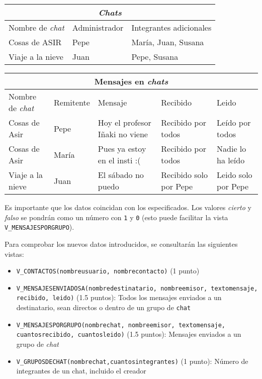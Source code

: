 \begin{homeworkProblem}
\begin{center}
  \begin{tabular}{|l|l|l|}
    \hline
    \multicolumn{3}{|c|}{\textit{Chats}} \\
    \hline
    Nombre de \textit{chat} & Administrador & Integrantes adicionales \\
    \hline
    Cosas de ASIR & Pepe & María, Juan, Susana \\
    Viaje a la nieve & Juan & Pepe, Susana \\
    \hline
  \end{tabular}

  
  \begin{tabular}{|l|l|l|l|l|}
    \hline
    \multicolumn{5}{|c|}{Mensajes en \textit{chats}} \\
    \hline
    Nombre de \textit{chat} & Remitente & Mensaje & Recibido & Leido \\
    \hline
    Cosas de Asir & Pepe & Hoy el profesor Iñaki no viene & Recibido por todos & Leído por todos \\
    Cosas de Asir & María & Pues ya estoy en el insti :( & Recibido por todos & Nadie lo ha leído \\
    Viaje a la nieve & Juan & El sábado no puedo & Recibido solo por Pepe & Leido solo por Pepe \\
    \hline
  \end{tabular}
\end{center}
  Es importante que los datos coincidan con los especificados. Los valores \textit{cierto} y \textit{falso} se pondrán como un número con \texttt{1} y \texttt{0} (esto puede facilitar la vista \texttt{V\_MENSAJESPORGRUPO}).
  

  Para comprobar los nuevos datos introducidos, se consultarán las siguientes vistas:
  
  \begin{itemize}
  \item \texttt{V\_CONTACTOS(nombreusuario, nombrecontacto)} (1 punto)
  
  \item \texttt{V\_MENSAJESENVIADOSA(nombredestinatario, nombreemisor, textomensaje, recibido, leido)} (1.5 puntos): Todos los mensajes enviados a un destinatario, sean directos o dentro de un grupo de \texttt{chat}
  \item \texttt{V\_MENSAJESPORGRUPO(nombrechat, nombreemisor, textomensaje, cuantosrecibido, cuantosleido)} (1.5 puntos): Mensajes enviados a un grupo de \textit{chat}
    
  \item \texttt{V\_GRUPOSDECHAT(nombrechat,cuantosintegrantes)} (1 punto): Número de integrantes de un chat, incluido el creador


\end{itemize}
\end{homeworkProblem}
